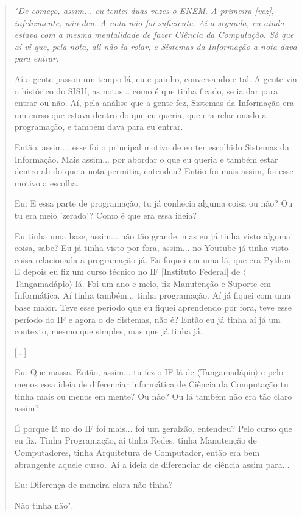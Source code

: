  \begin{quote}
     \itshape
     "De começo, assim... eu tentei duas vezes o ENEM. A primeira [vez], infelizmente, não deu. A nota não foi suficiente. Aí a segunda, eu ainda estava com a mesma mentalidade de fazer Ciência da Computação. Só que aí vi que, pela nota, ali não ia rolar, e Sistemas da Informação a nota dava para entrar. 

    Aí a gente passou um tempo lá, eu e painho, conversando e tal. A gente via o histórico do SISU, as notas... como é que tinha ficado, se ia dar para entrar ou não. Aí, pela análise que a gente fez, Sistemas da Informação era um curso que estava dentro do que eu queria, que era relacionado a programação, e também dava para eu entrar.

    Então, assim... esse foi o principal motivo de eu ter escolhido Sistemas da Informação. Mais assim... por abordar o que eu queria e também estar dentro ali do que a nota permitia, entendeu? Então foi mais assim, foi esse motivo a escolha.

    \colorbox{black!15}{Eu: E essa parte de programação, tu já conhecia alguma coisa ou não? Ou tu era} \colorbox{black!15}{meio 'zerado'? Como é que era essa ideia?}

    Eu tinha uma base, assim... não tão grande, mas eu já tinha visto alguma coisa, sabe? Eu já tinha visto por fora, assim... no Youtube já tinha visto coisa relacionada a programação já. Eu foquei em uma lá, que era Python. E depois eu fiz um curso técnico no IF [Instituto Federal] de $\langle$Tangamadápio$\rangle$ lá. Foi um ano e meio, fiz Manutenção e Suporte em Informática. Aí tinha também... tinha programação. Aí já fiquei com uma base maior. Teve esse período que eu fiquei aprendendo por fora, teve esse período do IF e agora o de Sistemas, não é? Então eu já tinha aí já um contexto, mesmo que simples, mas que já tinha já. 

    [...]

    \colorbox{black!15}{Eu: Que massa. Então, assim... tu fez o IF lá de $\langle$Tangamadápio$\rangle$ e pelo menos essa ideia} \colorbox{black!15}{de diferenciar informática de Ciência da Computação tu tinha mais ou menos em} \colorbox{black!15}{mente? Ou não? Ou lá também não era tão claro assim?}

    É porque lá no do IF foi mais... foi um geralzão, entendeu? Pelo curso que eu fiz. Tinha Programação, aí tinha Redes, tinha Manutenção de Computadores, tinha Arquitetura de Computador, então era bem abrangente aquele curso. Aí a ideia de diferenciar de ciência assim para...

    \colorbox{black!15}{Eu: Diferença de maneira clara não tinha?}

    Não tinha não".
 \end{quote}

